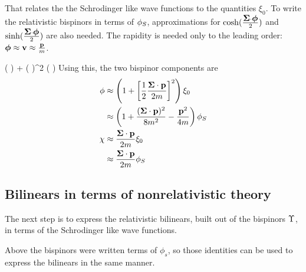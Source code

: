 That relates the the Schrodinger like wave functions to the quantities $\xi_0$.  To write the relativistic bispinors in terms of $\phi_S$, approximations for $\cosh( \frac{\mbox{\boldmath$ \Sigma $} \cdot \mbox{\boldmath$ \phi $} }{2})$ and $\sinh( \frac{\mbox{\boldmath$ \Sigma $} \cdot \mbox{\boldmath$ \phi $} }{2})$ are also needed.  The rapidity is needed only to the leading order: $\mbox{\boldmath$ \phi $} \approx \mathbf{v} \approx \frac{\mathbf{p} }{m}$. 

\beq
	\cosh( ) 
		 + \left(  \right)^2
\eeq
\beq
	\sinh( ) 
		\approx   {}
\eeq
Using this, the two bispinor components are
\begin{align}
\phi 
	&\approx  \left(  1 + \left[ \frac{1}{2}\frac{\mbox{\boldmath$ \Sigma $} \cdot \mathbf{p} }{2m} \right]^2 \right) \xi_0 \notag \\
	&\approx  \left(  1 + \frac{(\mbox{\boldmath$ \Sigma $} \cdot \mathbf{p})^2 }{8m^2} - \frac{\mathbf{p}^2}{4m} \right ) \phi_S	 \label{eq:nrPhi} \\
 \chi
 	&\approx	\frac{\mbox{\boldmath$ \Sigma $} \cdot \mathbf{p} }{2m} \xi_0 \notag \\
 	&\approx	\frac{\mbox{\boldmath$ \Sigma $} \cdot \mathbf{p} }{2m} \phi_S  \label{eq:nrChi}
\end{align}




\subsection{Bilinears in terms of nonrelativistic theory}
The next step is to express the relativistic bilinears, built out of the bispinors $\Upsilon$, in terms of the Schrodinger like wave functions.

Above the bispinors were written terms of $\phi_s$, so those identities can be used to express the bilinears in the same manner.  


